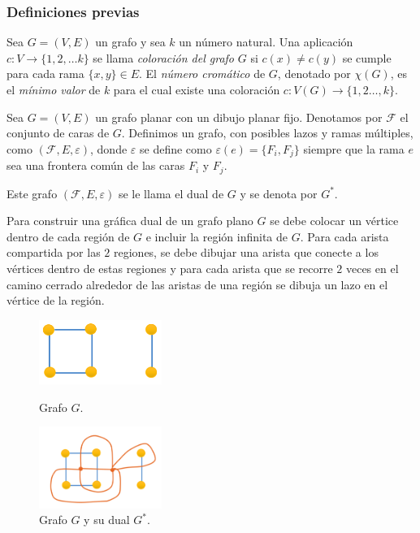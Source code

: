 \documentclass[spanish, utf8,handout]{beamer} %
\theoremstyle{definition}
\begin{document}
\begin{frame}[allowframebreaks]
\frametitle{Definiciones previas}

\begin{definition} 
Sea $G=(V,E)$ un grafo y sea $k$ un número natural. Una aplicación $c\colon V\to \{1,2,\ldots k\}$ se llama \emph{\color{DarkBlue}coloración del grafo} $G$ si $c(x)\neq c(y)$ se cumple para cada rama $\{x,y\}\in E$. \linebreak El \emph{\color{DarkBlue}número cromático} de $G$, denotado por $\chi(G)$, es el \emph{\color{red}mínimo valor} de $k$ para el cual existe una coloración $c\colon V(G)\to\{1,2\ldots,k\}$.
\end{definition}

\begin{definition}
Sea $G=(V,E)$ un grafo planar con un dibujo planar fijo. Denotamos por $\mathcal{F}$ el conjunto de caras de $G$. Definimos un grafo, con posibles lazos y ramas múltiples, como $(\mathcal{F},E,\varepsilon)$, donde $\varepsilon$ se define como $\varepsilon(e)=\{F_i,F_j\}$ siempre que la rama $e$ sea una frontera común de las caras $F_i$ y $F_j$.

Este grafo $\left(\mathcal{F},E,\varepsilon\right)$ se le llama el dual de $G$ y se denota por $G^{\ast}$.	
\end{definition}


\begin{example}
Para construir una gráfica dual de un grafo plano $G$ se debe colocar un vértice dentro de cada región de $G$ e incluir la región infinita de $G$. Para cada arista compartida por las $2$ regiones, se debe dibujar una arista que conecte a los vértices dentro de estas regiones y para cada arista que se recorre $2$ veces en el camino cerrado alrededor de las aristas de una región se dibuja un lazo en el vértice de la región. 
\end{example}

\begin{figure}[H]
	\captionsetup{justification=centering,margin=0.5cm}
	\centering
	\begin{minipage}{.5\textwidth}
		\centering
		\includegraphics[width=4cm]{example1}
		\caption{Grafo $G$.}
	\end{minipage}%
	\begin{minipage}{0.5\textwidth}
		\centering
		\includegraphics[width=4cm]{example2}
		\caption{Grafo $G$ y su dual $G^{\ast}$.}
	\end{minipage}
\end{figure}


\end{frame}
\end{document}
